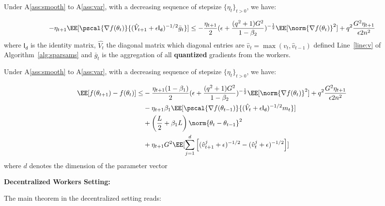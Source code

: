 \documentclass[11pt]{article}
\begin{document}
\begin{Lemma}\label{lem:lemma1}
Under A\ref{ass:smooth} to A\ref{ass:var}, with a decreasing sequence of stepsize $\{\eta_t\}_{t>0}$, we have:

\begin{equation}
-\eta_{t+1}\EE[\pscal{\nabla f(\theta_t)}{(\hat{V}_{t+1} + \epsilon \mathsf{I_d})^{-1/2} \bar{g}_t}] \leq - \frac{\eta_{t+1}}{2}  (\epsilon + \frac{(q^2+1)G^2}{1 - \beta_2})^{-\frac{1}{2}} \EE[\norm{\nabla f(\theta_t)}^2] +q^2 \frac{G^2 \eta_{t+1}}{\epsilon 2n^2}
\end{equation}
where $ \mathsf{I_d}$ is the identity matrix, $\hat{V_t}$ the diagonal matrix which diagonal entries are $\hat v_t=\max(v_t,\hat v_{t-1})$ defined Line~\ref{line:v} of Algorithm~\ref{alg:sparsams} and $\bar{g}_t$ is the aggregation of all \textbf{quantized} gradients from the workers.
\end{Lemma}

\begin{Lemma}\label{lem:lemma2}
Under A\ref{ass:smooth} to A\ref{ass:var}, with a decreasing sequence of stepsize $\{\eta_t\}_{t>0}$, we have:

\begin{equation}
\begin{split}
\EE[f(\theta_{t+1}) - f(\theta_{t}) ] \leq &   - \frac{\eta_{t+1}(1-\beta_1)}{2}  (\epsilon + \frac{(q^2+1)G^2}{1 - \beta_2})^{-\frac{1}{2}} \EE[\norm{\nabla f(\theta_t)}^2] +q^2 \frac{G^2 \eta_{t+1}}{\epsilon 2n^2} \\
&- \eta_{t+1} \beta_1\EE[\pscal{\nabla f(\theta_{t-1})}{(\hat{V}_{t} + \epsilon \mathsf{I_d})^{-1/2} m_{t}}]\\
& +  \left(\frac{L}{2} + \beta_1 L \right) \norm{\theta_t - \theta_{t-1}}^2\\
&+   \eta_{t+1} G^2 \EE[\sum_{j=1}^d \left[(\hat{v}^j_{t+1} + \epsilon )^{-1/2} - (\hat{v}^j_{t} + \epsilon )^{-1/2}  \right] ]
\end{split}
\end{equation}
where $d$ denotes the dimension of the parameter vector
\end{Lemma}


\textbf{Decentralized Workers Setting:}

The main theorem in the decentralized setting reads:
\end{document}
